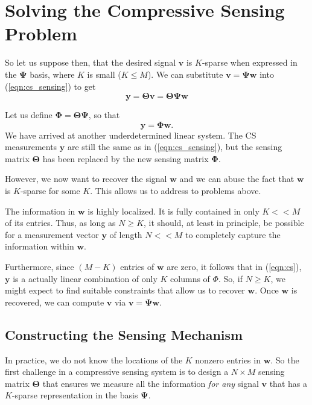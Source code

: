 \section{Solving the Compressive Sensing Problem}
So let us suppose then, that the desired signal $\bm v$ is $K$-sparse when expressed in the $\bm\Psi$ basis, where $K$ is small ($K\leq M$).
We can substitute $\bm v = \bm\Psi\bm w$ into (\ref{eqn:cs_sensing}) to get
\begin{equation*}
  \bm y = \bm\Theta\bm v = \bm\Theta\bm\Psi\bm w
\end{equation*}

Let us define $\bm\Phi = \bm\Theta\bm\Psi$, so that
\begin{equation}
  \label{eqn:cs}
  \bm y = \bm\Phi\bm w .
\end{equation}
We have arrived at another underdetermined linear system.
The CS measurements $\bm y$ are still the same as in (\ref{eqn:cs_sensing}), but the sensing matrix $\bm\Theta$ has been replaced by the new sensing matrix $\bm\Phi$.

However, we now want to recover the signal $\bm w$ and we can abuse the fact that $\bm w$ is $K$-sparse for some $K$.
This allows us to address to problems  above.

The information in $\bm w$ is highly localized.
It is fully contained in only $K << M$ of its entries.
Thus, as long as $N\geq K$, it should, at least in principle, be possible for a measurement vector $\bm y$ of length $N<<M$ to completely capture the information within $\bm w$.

Furthermore, since $(M-K)$ entries of $\bm w$ are zero, it follows that in (\ref{eqn:cs}), $\bm y$ is a actually linear combination of only $K$ columns of $\Phi$. 
So, if $N\geq K$, we might expect to find suitable constraints that allow us to recover $\bm w$.
Once $\bm w$ is recovered, we can compute $\bm v$ via $\bm v = \bm\Psi\bm w$.

\subsection{Constructing the Sensing Mechanism}
\label{sect:sensors}
In practice, we do not know the locations of the $K$ nonzero entries in $\bm w$.
So the first challenge in a compressive sensing system is to design a $N\times M$ sensing matrix $\bm\Theta$ that ensures we measure all the information \emph{for any} signal $\bm v$ that has a $K$-sparse representation in the basis $\bm\Psi$.

